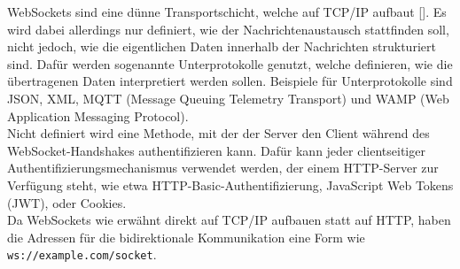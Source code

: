 WebSockets sind eine dünne Transportschicht, welche auf TCP/IP aufbaut [\cite{websockets}]. Es wird dabei allerdings nur definiert, wie der Nachrichtenaustausch stattfinden soll, nicht jedoch, wie die eigentlichen Daten innerhalb der Nachrichten strukturiert sind. Dafür werden sogenannte Unterprotokolle genutzt, welche definieren, wie die übertragenen Daten interpretiert werden sollen. Beispiele für Unterprotokolle sind JSON, XML, MQTT (Message Queuing Telemetry Transport) und WAMP (Web Application Messaging Protocol).\\
Nicht definiert wird eine Methode, mit der der Server den Client während des WebSocket-Handshakes authentifizieren kann. Dafür kann jeder clientseitiger Authentifizierungsmechanismus verwendet werden, der einem HTTP-Server zur Verfügung steht, wie etwa HTTP-Basic-Authentifizierung, JavaScript Web Tokens (JWT), oder Cookies.\\
Da WebSockets wie erwähnt direkt auf TCP/IP aufbauen statt auf HTTP, haben die Adressen für die bidirektionale Kommunikation eine Form wie \verb|ws://example.com/socket|.
